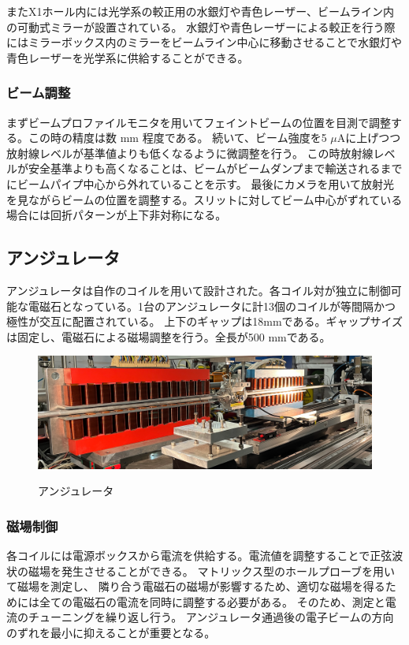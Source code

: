 \documentclass[a4paper,11pt,uplatex]{jsbook}
\begin{document}
またX1ホール内には光学系の較正用の水銀灯や青色レーザー、ビームライン内の可動式ミラーが設置されている。
水銀灯や青色レーザーによる較正を行う際にはミラーボックス内のミラーをビームライン中心に移動させることで水銀灯や青色レーザーを光学系に供給することができる。
\subsubsection{ビーム調整}
まずビームプロファイルモニタを用いてフェイントビームの位置を目測で調整する。この時の精度は数 mm 程度である。
続いて、ビーム強度を5 $\si{\mu}\text{A}$に上げつつ放射線レベルが基準値よりも低くなるように微調整を行う。
この時放射線レベルが安全基準よりも高くなることは、ビームがビームダンプまで輸送されるまでにビームパイプ中心から外れていることを示す。
最後にカメラを用いて放射光を見ながらビームの位置を調整する。スリットに対してビーム中心がずれている場合には回折パターンが上下非対称になる。

\subsection{アンジュレータ}
アンジュレータは自作のコイルを用いて設計された。各コイル対が独立に制御可能な電磁石となっている。1台のアンジュレータに計13個のコイルが等間隔かつ極性が交互に配置されている。
上下のギャップは18mmである。ギャップサイズは固定し、電磁石による磁場調整を行う。全長が500 mmである。
\begin{figure}
  \centering
  \includegraphics[width=0.8\linewidth]{image/3-undulator.png}\\
  \caption{アンジュレータ}
  \label{undulator}
\end{figure}
\subsubsection{磁場制御}
各コイルには電源ボックスから電流を供給する。電流値を調整することで正弦波状の磁場を発生させることができる。
マトリックス型のホールプローブを用いて磁場を測定し、
隣り合う電磁石の磁場が影響するため、適切な磁場を得るためには全ての電磁石の電流を同時に調整する必要がある。
そのため、測定と電流のチューニングを繰り返し行う。
アンジュレータ通過後の電子ビームの方向のずれを最小に抑えることが重要となる。
\end{document}
